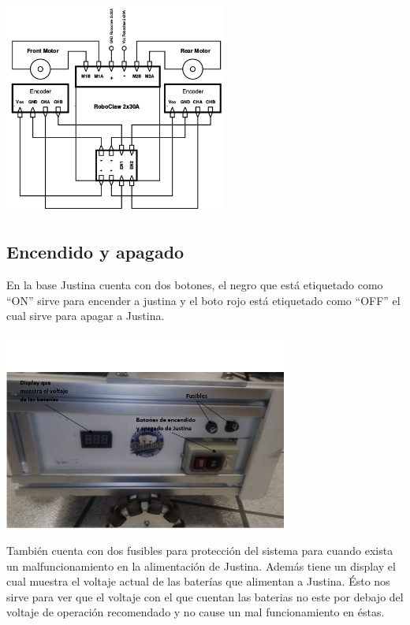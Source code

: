 \documentclass[a4paper,usenames,dvipsnames,svgnames,table]{book}
\begin{document}
\begin{center}
\includegraphics[width=0.55\textwidth]{Figures/Hardware/Esquematicos/Roboclaw_2.png}
\label{fig:Hardware:Partes:Diagrama:Esquematico:Roboclaw:2}
\end{center}


\subsection{Encendido y apagado}

En la base Justina cuenta con dos botones, el negro que está etiquetado como ``ON'' sirve para encender a justina y el boto
rojo está etiquetado como ``OFF'' el cual sirve para apagar a Justina.\\

\begin{center}
\includegraphics[width=0.7\textwidth]{Figures/Hardware/Diagramas/Encendido.png}
\label{fig:Hardware:Diagramas:Justina:Encendido}
\end{center}

También cuenta con dos fusibles para protección del sistema para cuando exista un malfuncionamiento en la alimentación de 
Justina. Además tiene un display el cual muestra el voltaje actual de las baterías que alimentan a Justina. Ésto nos sirve
para ver que el voltaje con el que cuentan las baterias no este por debajo del voltaje de operación recomendado y no cause
un mal funcionamiento en éstas.
\end{document}
